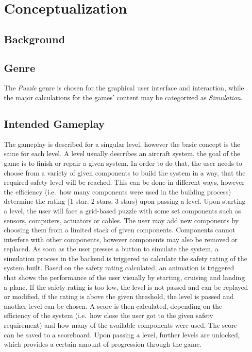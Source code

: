 \section{Conceptualization}\label{sec:design}
\subsection{Background}\label{subsec:background}
\subsection{Genre}\label{subsec:genre}
The \textit{Puzzle} genre is chosen for the graphical user interface and interaction, while the major calculations for the
games' content may be categorized as \textit{Simulation}.

\subsection{Intended Gameplay}\label{subsec:intended-gameplay}
The gameplay is described for a singular level, however the basic concept is the same for each level.
A level usually describes an aircraft system, the goal of the game is to finish or repair a given system.
In order to do that, the user needs to choose from a variety of given components to build the system in a way, that the
required safety level will be reached.
This can be done in different ways, however the efficiency (i.e.\ how many components were used in the building process) determine
the rating (1 star, 2 stars, 3 stars) upon passing a level.
Upon starting a level, the user will face a grid-based puzzle with some set components such as sensors, computers, actuators
or cables.
The user may add new components by choosing them from a limited stack of given components.
Components cannot interfere with other components, however components may also be removed or replaced.
As soon as the user presses a button to simulate the system, a simulation process in the backend is triggered to calculate
the safety rating of the system built.
Based on the safety rating calculated, an animation is triggered that shows the performance of the user visually by starting, cruising
and landing a plane.
If the safety rating is too low, the level is not passed and can be replayed or modified, if the rating is above the given
threshold, the level is passed and another level can be chosen.
A score is then calculated, depending on the efficiency of the system (i.e.\ how close the user got to the given safety requirement) and
how many of the available components were used.
The score can be saved to a scoreboard.
Upon passing a level, further levels are unlocked, which provides a certain amount of progression through the game.

